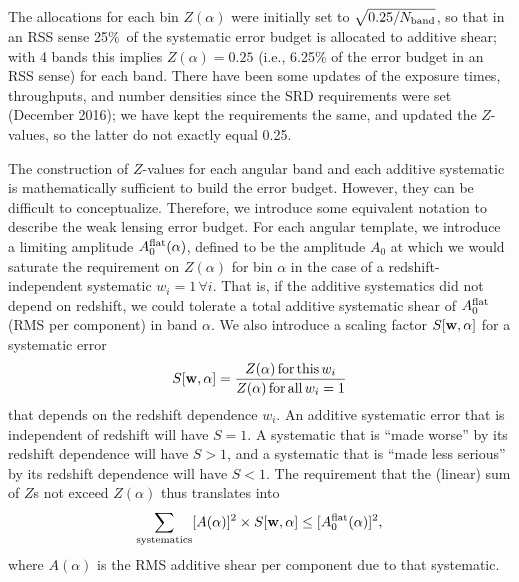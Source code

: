 \documentclass[usenatbib]{mnras}
\begin{document}
The allocations for each bin $Z(\alpha)$ were initially set to $\sqrt{0.25/N_{\rm band}}$, so that in an RSS sense 25\%\ of the systematic error budget is allocated to additive shear; with 4 bands this implies $Z(\alpha)=0.25$ (i.e., 6.25\% of the error budget in an RSS sense) for each band. There have been some updates of the exposure times, throughputs, and number densities since the SRD requirements were set (December 2016); we have kept the requirements the same, and updated the $Z$-values, so the latter do not exactly equal 0.25.

The construction of $Z$-values for each angular band and each additive
systematic is mathematically sufficient to build the error
budget. However, they can be difficult to conceptualize. Therefore, we
introduce some equivalent notation to describe the weak lensing error
budget. For each angular template, we introduce a limiting amplitude
$A_0^{\rm flat}(\alpha)$, defined to be the amplitude $A_0$ at which
we would saturate the requirement on $Z(\alpha)$ for bin $\alpha$ in
the case of a redshift-independent systematic $w_i=1\,\forall i$. That
is, if the additive systematics did not depend on redshift, we could
tolerate a total additive systematic shear of $A_0^{\rm flat}$ (RMS
per component) in band $\alpha$. We also introduce a scaling factor
$S[{\bf w},\alpha]$ for a systematic error
\begin{equation}
S[{\bf w},\alpha] = \frac{Z(\alpha) \,{\rm for\,this\,}w_i}{Z(\alpha)\,{\rm for\,all\,}w_i=1}
\label{eq:Swa}
\end{equation}
that depends on the redshift dependence $w_i$. An additive systematic error that is independent of redshift will have $S=1$. A systematic that is ``made worse'' by its redshift dependence will have $S>1$, and a systematic that is ``made less serious'' by its redshift dependence will have $S<1$. The requirement that the (linear) sum of $Z$s not exceed $Z(\alpha)$ thus translates into
\begin{equation}
\sum_{\rm systematics} [A(\alpha)]^2\times S[{\bf w},\alpha] \le [A_0^{\rm flat}(\alpha)]^2,
\label{eq:A-S-sum}
\end{equation}
where $A(\alpha)$ is the RMS additive shear per component due to that systematic.
\end{document}
